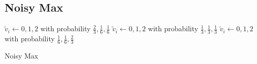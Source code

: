\subsection{Noisy Max}


\begin{algorithm}
  \begin{algorithmic}[1]
                {$\tilde{v}_i \leftarrow 0, 1, 2$ with probability
                 $\frac{2}{3}, \frac{1}{6}, \frac{1}{6}$}
                {$\tilde{v}_i \leftarrow 0, 1, 2$ with probability
                 $\frac{1}{3}, \frac{1}{3}, \frac{1}{3}$}
                {$\tilde{v}_i \leftarrow 0, 1, 2$ with probability
                 $\frac{1}{6}, \frac{1}{6}, \frac{2}{3}$}
        \EndMatch
      \EndFor
    \EndProcedure
  \end{algorithmic}
  \caption{Noisy Max}
  \label{algorithm:noisy-max}
\end{algorithm}

